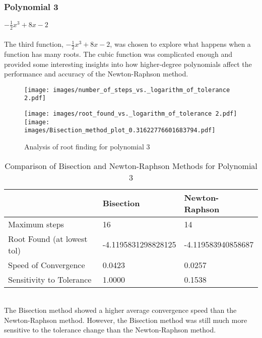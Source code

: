 \documentclass{llncs}
\numberwithin{figure}{section}
\begin{document}
\subsubsection{Polynomial 3} \(-\frac{1}{2}x^3 + 8x -2\)
\\\\The third function, $-\frac{1}{2}x^3 + 8x -2$, was chosen to explore what happens when a function has many roots. The cubic function was complicated enough and provided some interesting insights into how higher-degree polynomials affect the performance and accuracy of the Newton-Raphson method.
\begin{figure}[h!]
    \centering
    \begin{minipage}[c]{0.65\textwidth}
        \centering
        \texttt{[image: images/number\_of\_steps\_vs.\_logarithm\_of\_tolerance 2.pdf]}
    \end{minipage}%
    \begin{minipage}[c]{0.35\textwidth}
        \centering
        \texttt{[image: images/root\_found\_vs.\_logarithm\_of\_tolerance 2.pdf]}
        \hspace{6em} %
        \texttt{[image: images/Bisection\_method\_plot\_0.31622776601683794.pdf]}
    \end{minipage}
    \caption{Analysis of root finding for polynomial 3}
    \label{fig:composite}
\end{figure}
\vspace{-2em}
\begin{table}[h!]
\centering
\caption{Comparison of Bisection and Newton-Raphson Methods for Polynomial 3}
\begin{tabularx}{\textwidth}{|X|X|X|}
\hline
 & Bisection & Newton-Raphson \\
\hline
Maximum steps & 16 & 14 \\
\hline
Root Found (at lowest tol) & -4.1195831298828125 & -4.119583940858687 \\
\hline
Speed of Convergence & 0.0423 & 0.0257 \\
\hline
Sensitivity to Tolerance & 1.0000 & 0.1538 \\
\hline
\end{tabularx}
\end{table}
\\The Bisection method showed a higher average convergence speed than the Newton-Raphson method. However, the Bisection method was still much more sensitive to the tolerance change than the Newton-Raphson method.
\newpage
\end{document}

